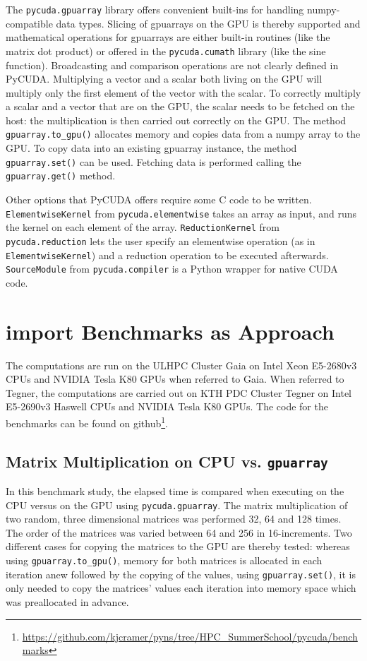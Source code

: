 \documentclass[11pt]{article}
\begin{document}
The \texttt{pycuda.gpuarray} library offers convenient built-ins for handling numpy-compatible data types. Slicing of gpuarrays on the GPU is thereby supported and mathematical operations for gpuarrays are either built-in routines (like the matrix dot product) or offered in the \texttt{pycuda.cumath} library (like the sine function). Broadcasting and comparison operations are not clearly defined in PyCUDA. Multiplying a vector and a scalar both living on the GPU will multiply only the first element of the vector with the scalar. To correctly multiply a scalar and a vector that are on the GPU, the scalar needs to be fetched on the host: the multiplication is then carried out correctly on the GPU. The method \texttt{gpuarray.to\_gpu()} allocates memory and copies data from a numpy array to the GPU. To copy data into an existing gpuarray instance, the method \texttt{gpuarray.set()} can be used. Fetching data is performed calling the \texttt{gpuarray.get()} method. 

Other options that PyCUDA offers require some C code to be written. \texttt{ElementwiseKernel} from \texttt{pycuda.elementwise} takes an array as input, and runs the kernel on each element of the array. \texttt{ReductionKernel} from \texttt{pycuda.reduction} lets the user specify an elementwise operation (as in \texttt{ElementwiseKernel}) and a reduction operation to be executed afterwards. \texttt{SourceModule} from \texttt{pycuda.compiler} is a Python wrapper for native CUDA code.

\section{import Benchmarks as Approach}

The computations are run on the ULHPC Cluster Gaia on Intel Xeon E5-2680v3 CPUs and NVIDIA Tesla K80 GPUs when referred to Gaia. When referred to Tegner, the computations are carried out on KTH PDC Cluster Tegner on Intel E5-2690v3 Haswell CPUs and NVIDIA Tesla K80 GPUs. The code for the benchmarks can be found on github\footnote{\url{https://github.com/kjcramer/pyns/tree/HPC_SummerSchool/pycuda/benchmarks}}.

\subsection{Matrix Multiplication on CPU vs. \texttt{gpuarray}}

In this benchmark study, the elapsed time is compared when executing on the CPU versus on the GPU using \texttt{pycuda.gpuarray}. The matrix multiplication of two random, three dimensional matrices was performed 32, 64 and 128 times. The order of the matrices was varied between 64 and 256 in 16-increments.
Two different cases for copying the matrices to the GPU are thereby tested: whereas using \texttt{gpuarray.to\_gpu()}, memory for both matrices is allocated in each iteration anew followed by the copying of the values, using \texttt{gpuarray.set()}, it is only needed to copy the matrices' values each iteration into memory space which was preallocated in advance.
\end{document}
